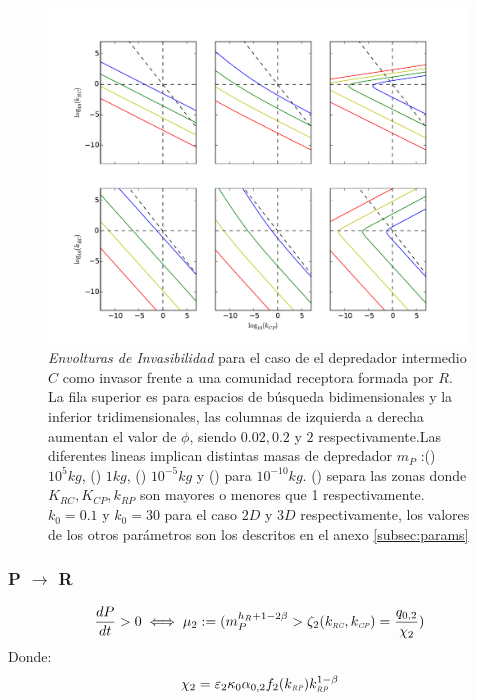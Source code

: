 \begin{figure}
  \centering
  \includegraphics[width = 0.99\textwidth]{./Plots/Z(IC2)AcGrGr.pdf}
  \caption[Env $Z(IC2)$]{\emph{Envolturas de Invasibilidad} para el caso de el depredador intermedio $C$ como invasor frente a una comunidad receptora formada por $R$. La fila superior es para espacios de b\'usqueda bidimensionales y la inferior tridimensionales, las columnas de izquierda a derecha aumentan el valor de $\phi$, siendo $0.02,0.2$ y $2$ respectivamente.Las diferentes lineas implican distintas masas de depredador $m_P$ :({\hwplotR}) $10^5 kg$,  ({\hwplotY}) $1kg$, ({\hwplotG}) $10^{-5}kg$ y ({\hwplotB}) para $10^{-10}kg$. ({\hwplotK}) separa las zonas donde $K_{RC},K_{CP},k_{RP}$ son mayores o menores que 1 respectivamente. $k_0 = 0.1$ y $k_0 = 30$ para el caso $2D$ y $3D$ respectivamente, los valores de los otros par\'ametros son los descritos en el anexo \ref{subsec:params}}
  \label{fig:Z(IC2)}
\end{figure}

\subsubsection{P $\to$ R}

\begin{equation}
  \frac{dP}{dt} >0 \iff \mu_2 := ( m_P^{h_R + 1 - 2\beta} > \zeta_2(k_{\textit{\tiny RC}},k_{\textit{\tiny CP}}) = \frac{q_{0,2}}{\chi_2} )
\end{equation}
Donde:
\begin{equation}
  \begin{aligned}
    \chi_2 &= \varepsilon_2 \kappa_0\alpha_{0,2} f_2(k_{\textit{\tiny RP}})k_{\textit{\tiny RP}}^{1-\beta} \\
  \end{aligned}
\end{equation}

